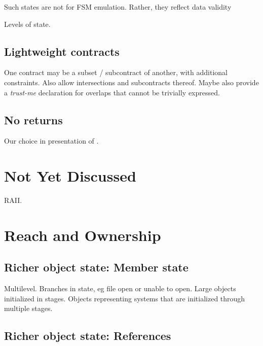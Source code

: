 \documentclass[10pt]{amsart}
\begin{document}
Such states are not for FSM emulation.  Rather, they reflect data validity


Levels of state.

\subsection{Lightweight contracts}

One contract may be a subset / subcontract of another, with additional
constraints.  Also allow intersections and subcontracts thereof.
Maybe also provide a \emph{trust-me} declaration for overlaps that
cannot be trivially expressed.

\subsection{No returns}

Our choice in presentation of \Utop.

\section{Not Yet Discussed}

RAII.

\section{Reach and Ownership}

\subsection{Richer object state: Member state}

Multilevel.  Branches in state, eg file open or unable to open.
Large objects initialized in stages.  Objects representing systems
that are initialized through multiple stages.

\subsection{Richer object state: References}
\end{document}
